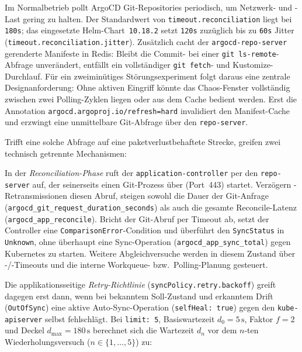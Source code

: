 Im Normalbetrieb pollt ArgoCD Git-Repositories periodisch, um Netzwerk- und -Last gering zu halten. Der Standardwert von \texttt{timeout.\allowbreak{}reconciliation} liegt bei \texttt{180s}; das eingesetzte Helm-Chart~\texttt{10.18.2} setzt \texttt{120s} zuzüglich bis zu \texttt{60s} Jitter (\texttt{timeout.\allowbreak{}reconciliation.\allowbreak{}jitter}).\autocite{argocd_reconcile_2026,argo_helm_2026} Zusätzlich cacht der \texttt{argocd-\allowbreak{}repo-\allowbreak{}server} gerenderte Manifeste in Redis: Bleibt die Commit- bei einer \texttt{git ls-remote}-Abfrage unverändert, entfällt ein vollständiger \texttt{git fetch}- und Kustomize-Durchlauf.\autocite{argocd_reconcile_2026} Für ein zweiminütiges Störungsexperiment folgt daraus eine zentrale Designanforderung: Ohne aktiven Eingriff könnte das Chaos-Fenster vollständig zwischen zwei Polling-Zyklen liegen oder aus dem Cache bedient werden. Erst die Annotation \texttt{argocd.\allowbreak{}argoproj.io/\allowbreak{}refresh=hard} invalidiert den Manifest-Cache und erzwingt eine unmittelbare Git-Abfrage über den \texttt{repo-server}.\autocite{argocd_reconcile_2026}

Trifft eine solche Abfrage auf eine paketverlustbehaftete Strecke, greifen zwei technisch getrennte Mechanismen:

In der \textit{Reconciliation-Phase} ruft der \texttt{application-\allowbreak{}controller} per  den \texttt{repo-server} auf, der seinerseits einen Git-Prozess über  (Port~443) startet. Verzögern -Retransmissionen diesen Abruf, steigen sowohl die Dauer der Git-Anfrage (\texttt{argocd\_\allowbreak{}git\_\allowbreak{}request\_\allowbreak{}duration\_\allowbreak{}seconds}) als auch die gesamte Reconcile-Latenz (\texttt{argocd\_\allowbreak{}app\_\allowbreak{}reconcile}).\autocite{argocd_metrics_2026} Bricht der Git-Abruf per Timeout ab, setzt der Controller eine \texttt{ComparisonError}-Condition und überführt den \texttt{SyncStatus} in \texttt{Unknown}, ohne überhaupt eine Sync-Operation (\texttt{argocd\_\allowbreak{}app\_\allowbreak{}sync\_\allowbreak{}total}) gegen Kubernetes zu starten. Weitere Abgleichversuche werden in diesem Zustand über -/-Timeouts und die interne Workqueue- bzw.\ Polling-Planung gesteuert.

Die applikationsseitige \textit{Retry-Richtlinie} (\texttt{syncPolicy.retry.backoff}) greift dagegen erst dann, wenn bei bekanntem Soll-Zustand und erkanntem Drift (\texttt{OutOfSync}) eine aktive Auto-Sync-Operation (\texttt{selfHeal: true}) gegen den \texttt{kube-apiserver} selbst fehlschlägt.\autocite{argocd_autosync_2026} Bei \texttt{limit: 5}, Basiswartezeit $d_0 = 5\,\text{s}$, Faktor $f = 2$ und Deckel $d_{\max} = 180\,\text{s}$ berechnet sich die Wartezeit $d_n$ vor dem $n$-ten Wiederholungsversuch ($n \in \{1, \dots, 5\}$) zu:

